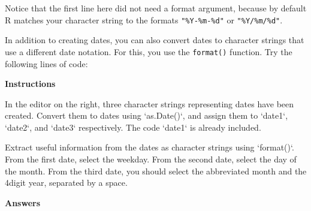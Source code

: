 \documentclass[]{article}
\newcommand{\hlnum}[1]{\textcolor[rgb]{0.816,0.125,0.439}{#1}}%
\newcommand{\hlstr}[1]{\textcolor[rgb]{0.251,0.627,0.251}{#1}}%
\newcommand{\hlstd}[1]{\textcolor[rgb]{0.251,0.251,0.251}{#1}}%
\newcommand{\hlkwc}[1]{\textcolor[rgb]{0.251,0.251,0.251}{#1}}%
\newcommand{\hlkwd}[1]{\textcolor[rgb]{0.878,0.439,0.125}{#1}}%
\newenvironment{Shaded}{\begin{myshaded}}{\end{myshaded}}
\newcommand{\KeywordTok}[1]{\hlkwd{#1}}
\newcommand{\DataTypeTok}[1]{\hlkwc{#1}}
\newcommand{\DecValTok}[1]{\hlnum{#1}}
\newcommand{\StringTok}[1]{\hlstr{#1}}
\newcommand{\NormalTok}[1]{\hlstd{#1}}
\begin{document}
Notice that the first line here did not need a format argument, because
by default R matches your character string to the formats
\texttt{"\%Y-\%m-\%d"} or \texttt{"\%Y/\%m/\%d"}.

In addition to creating dates, you can also convert dates to character
strings that use a different date notation. For this, you use the
\texttt{format()} function. Try the following lines of code:

\begin{Shaded}
\end{Shaded}

\textbf{Instructions}

\begin{Shaded}
\begin{Highlighting}[]
\OperatorTok{*}\StringTok{ }\NormalTok{In the editor on the right, three character strings representing dates have been created. Convert them to dates using }\StringTok{`}\DataTypeTok{as.Date()}\StringTok{`}\NormalTok{, and assign them to }\StringTok{`}\DataTypeTok{date1}\StringTok{`}\NormalTok{, }\StringTok{`}\DataTypeTok{date2}\StringTok{`}\NormalTok{, and }\StringTok{`}\DataTypeTok{date3}\StringTok{`}\NormalTok{ respectively. The code } \StringTok{`}\DataTypeTok{date1}\StringTok{`}\NormalTok{ is already included.}

\OperatorTok{*}\StringTok{ }\NormalTok{Extract useful information from the dates as character strings using }\StringTok{`}\DataTypeTok{format()}\StringTok{`}\NormalTok{. From the first date, select the weekday. From the second date, select the day of the month. From the third date, you should select the abbreviated month and the }\DecValTok{4}\OperatorTok{-}\NormalTok{digit year, separated by a space.}
\end{Highlighting}
\end{Shaded}

\textbf{Answers}
\end{document}

